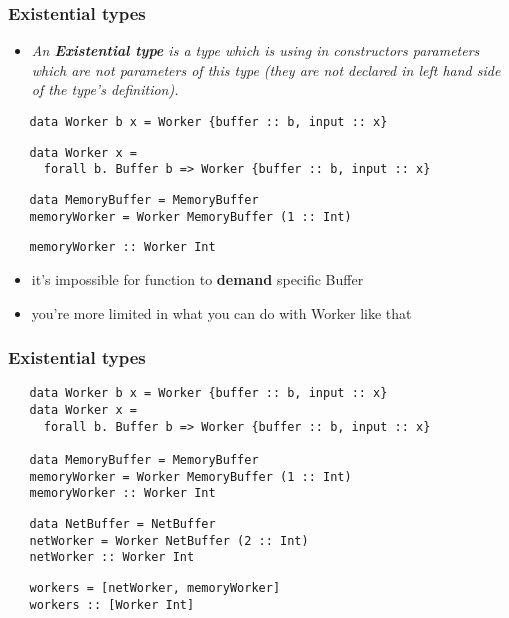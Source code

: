 \documentclass[aspectratio=43]{beamer}
\begin{document}
\begin{frame}[fragile]
  \frametitle{Existential types}
  \begin{itemize}
   \item \textit{An \textbf{Existential type} is a type which is using in constructors parameters which are not parameters of this type (they are not declared in left hand side of the type's definition).}
  \end{itemize}
  \pause
  \begin{lstlisting}
   data Worker b x = Worker {buffer :: b, input :: x}
  \end{lstlisting}
  \pause
  \begin{lstlisting}
   data Worker x =
     forall b. Buffer b => Worker {buffer :: b, input :: x}
  \end{lstlisting}
  \pause
  \begin{lstlisting}
   data MemoryBuffer = MemoryBuffer
   memoryWorker = Worker MemoryBuffer (1 :: Int)
  \end{lstlisting}
  \pause
  \begin{lstlisting}
   memoryWorker :: Worker Int
  \end{lstlisting}
  \pause
  \begin{itemize}
   \item it's impossible for function to \textbf{demand} specific Buffer
   \item you're more limited in what you can do with Worker like that
  \end{itemize}
\end{frame}

\begin{frame}[fragile]
  \frametitle{Existential types}
  \begin{lstlisting}
   data Worker b x = Worker {buffer :: b, input :: x}
   data Worker x =
     forall b. Buffer b => Worker {buffer :: b, input :: x}
   
   data MemoryBuffer = MemoryBuffer
   memoryWorker = Worker MemoryBuffer (1 :: Int)
   memoryWorker :: Worker Int
  \end{lstlisting}
  \pause
  \begin{lstlisting}
   data NetBuffer = NetBuffer
   netWorker = Worker NetBuffer (2 :: Int)
   netWorker :: Worker Int
  \end{lstlisting}
  \pause
  \begin{lstlisting}
   workers = [netWorker, memoryWorker]
   workers :: [Worker Int]
  \end{lstlisting}
\end{frame}
\end{document}
